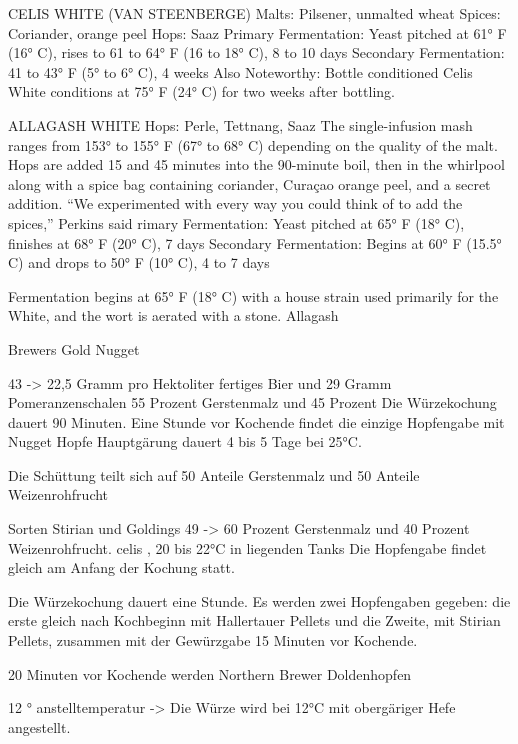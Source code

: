 \documentclass[a4paper,parskip=half]{scrartcl}
\begin{document}
\parencite[53-54]{Hieronymus2010}
CELIS WHITE (VAN STEENBERGE)
Malts: Pilsener, unmalted wheat
Spices: Coriander, orange peel
Hops: Saaz
Primary Fermentation: Yeast pitched at 61° F (16° C), rises to 61 to 64° F (16
to 18° C), 8 to 10 days
Secondary Fermentation: 41 to 43° F (5° to 6° C), 4 weeks
Also Noteworthy: Bottle conditioned
Celis White conditions at 75° F (24° C) for two weeks after bottling.

\parencite[56-58]{Hieronymus2010}
ALLAGASH WHITE
Hops: Perle, Tettnang, Saaz
The single-infusion mash ranges from 153° to 155° F (67° to 68° C)
depending on the quality of the malt. Hops are added 15 and 45 minutes
into the 90-minute boil, then in the whirlpool along with a spice bag
containing coriander, Curaçao orange peel, and a secret addition. “We
experimented with every way you could think of to add the spices,”
Perkins said
rimary Fermentation: Yeast pitched at 65° F (18° C), finishes at 68° F (20°
C), 7 days
Secondary Fermentation: Begins at 60° F (15.5° C) and drops to 50° F (10°
C), 4 to 7 days

Fermentation begins at 65° F (18° C) with a house strain used
primarily for the White, and the wort is aerated with a stone. Allagash






Brewers Gold
Nugget

43 -> 22,5 Gramm pro Hektoliter fertiges Bier und 29 Gramm Pomeranzenschalen
55 Prozent Gerstenmalz und 45 Prozent
Die Würzekochung dauert 90 Minuten. Eine Stunde vor
Kochende findet die einzige Hopfengabe mit Nugget Hopfe
Hauptgärung dauert 4 bis 5 Tage bei 25°C.


Die Schüttung teilt sich auf 50 Anteile Gerstenmalz und 50 Anteile Weizenrohfrucht

Sorten Stirian und Goldings
49 -> 60 Prozent Gerstenmalz und 40 Prozent Weizenrohfrucht.
celis , 20 bis 22°C in liegenden Tanks
Die Hopfengabe
findet gleich am Anfang der Kochung statt.

Die Würzekochung dauert eine Stunde. Es werden zwei Hopfengaben gegeben: die
erste gleich nach Kochbeginn mit Hallertauer Pellets und die Zweite, mit Stirian
Pellets, zusammen mit der Gewürzgabe 15 Minuten vor Kochende.

20 Minuten vor Kochende werden Northern
Brewer Doldenhopfen

12 ° anstelltemperatur -> Die Würze wird bei 12°C mit obergäriger Hefe angestellt.

\printbibliography[title=Quellen]
\end{document}
